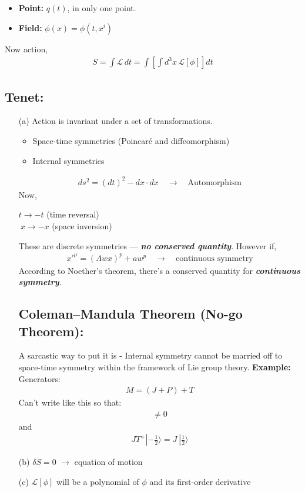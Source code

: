 \documentclass[14pt]{article} %
\begin{document}
\vspace{-1cm}
\begin{itemize}
    \item \textbf{Point:} $q(t)$, in only one point.
    \item \textbf{Field:} $\phi(x) = \phi(t, x^i)$
\end{itemize}
Now action,
\begin{align*}
S = \int \mathcal{L} \, dt = \int \left[ \int d^3x \, \mathcal{L}[\phi] \right] dt
\end{align*}
\subsection*{Tenet:}
\begin{enumerate}
    \item[(a)] Action is invariant under a set of transformations.
    \begin{itemize}
        \item Space-time symmetries (Poincaré and diffeomorphism)
        \item Internal symmetries
    \end{itemize}
    \begin{align*}
    ds^2 = (dt)^2 - dx \cdot dx \quad \to \quad \text{Automorphism}
    \end{align*}
Now,
\vspace{-0.5cm}
\begin{center}
    $t \rightarrow -t$ \quad (time reversal) \\
    $~x \rightarrow -x$ \quad (space inversion)
\end{center}
These are discrete symmetries — \textbf{\textit{no conserved quantity}}. However if,
\begin{align*}
x'^\mu = (\Lambda wx)^p + aw^p \quad \to \quad \text{continuous symmetry}
\end{align*}
According to Noether’s theorem, there's a conserved quantity for \textbf{\textit{continuous symmetry}}.

\begin{tcolorbox}[ title=Notes]
\subsection*{Coleman–Mandula Theorem (No-go Theorem):}
A sarcastic way to put it is - Internal symmetry cannot be married off to space-time symmetry within the framework of Lie group theory. \textbf{Example:} Generators:
\begin{align*}
M = (J + P) + T
\end{align*}
Can't write like this so that:
\begin{align*}
[J, T] \ne 0
\end{align*}
and
\begin{align*}
JT^+ |-\frac{1}{2} \rangle = J~ |\frac{1}{2} \rangle
\end{align*}
\end{tcolorbox}

    \item[(b)] $\delta S = 0$ \quad $\to$ equation of motion
    \item[(c)] $\mathcal{L}[\phi]$ will be a polynomial of $\phi$ and its first-order derivative
\end{enumerate}
\end{document}
